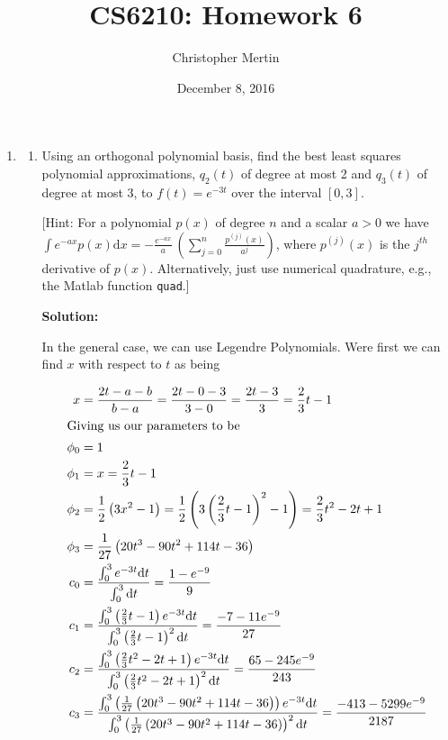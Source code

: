 \documentclass[12pt]{article}
\begin{document}
\title{CS6210: Homework 6}
\author{Christopher Mertin}
\date{December 8, 2016}
\maketitle

\begin{enumerate}
\item 

\begin{enumerate}
\item Using an orthogonal polynomial basis, find the best least squares polynomial approximations, $q_{2}(t)$ of degree at most 2 and $q_{3}(t)$ of degree at most 3, to $f(t) = e^{-3t}$ over the interval $[0,3]$.

[Hint: For a polynomial $p(x)$ of degree $n$ and a scalar $a > 0$ we have $\int e^{-ax}p(x)\text{d}x = -\frac{e^{-ax}}{a}\ \left( \sum_{j=0}^{n} \frac{p^{(j)}(x)}{a^{j}}\right)$, where $p^{(j)}(x)$ is the $j^{th}$ derivative of $p(x)$. Alternatively, just use numerical quadrature, e.g., the {\sc Matlab} function {\tt quad}.]

{\bf Solution:}

In the general case, we can use Legendre Polynomials. Were first we can find $x$ with respect to $t$ as being

\begin{align*}
x &= \frac{2t-a-b}{b-a} = \frac{2t-0-3}{3-0} = \frac{2t-3}{3} = \frac{2}{3}t - 1\\
\intertext{Giving us our parameters to be}
\phi_{0} &= 1\\
\phi_{1} &= x = \frac{2}{3}t - 1\\
\phi_{2} &= \frac{1}{2}\left( 3x^{2} - 1\right) = \frac{1}{2}\left( 3 \left(\frac{2}{3}t - 1\right)^{2}-1\right) = \frac{2}{3}t^{2} - 2t + 1\\
\phi_{3} &= \frac{1}{27}\left( 20t^{3} - 90t^{2} + 114t - 36\right)\\
c_{0} &= \frac{\int_{0}^{3}e^{-3t}\text{d}t}{\int_{0}^{3}\text{d}t} = \frac{1 - e^{-9}}{9}\\
c_{1} &= \frac{\int_{0}^{3}\left( \frac{2}{3}t - 1\right) e^{-3t}\text{d}t}{\int_{0}^{3}\left( \frac{2}{3}t - 1\right)^{2}\text{d}t} = \frac{-7 -11e^{-9}}{27}\\
c_{2} &= \frac{\int_{0}^{3}\left( \frac{2}{3}t^{2} - 2t + 1\right)e^{-3t}\text{d}t}{\int_{0}^{3}\left( \frac{2}{3}t^{2} - 2t + 1 \right)^{2}\text{d}t} = \frac{65 - 245 e^{-9}}{243}\\
c_{3} &= \frac{\int_{0}^{3}\left( \frac{1}{27}\left( 20t^{3} - 90t^{2} + 114t - 36\right)\right)e^{-3t}\text{d}t}{\int_{0}^{3}\left( \frac{1}{27}\left( 20t^{3} - 90t^{2} + 114t - 36\right)\right)^{2}\text{d}t} = \frac{-413 - 5299e^{-9}}{2187}
\end{align*}


\end{enumerate}
\end{enumerate}
\end{document}
